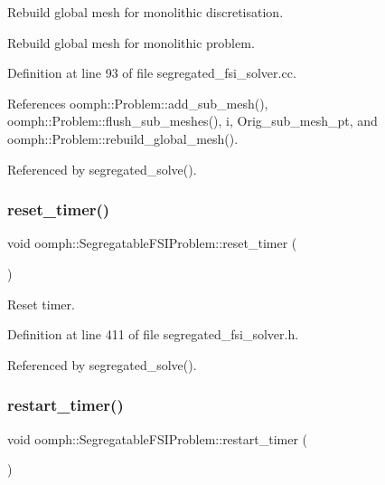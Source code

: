 Rebuild global mesh for monolithic discretisation. 

Rebuild global mesh for monolithic problem. 

Definition at line 93 of file segregated\+\_\+fsi\+\_\+solver.\+cc.



References oomph\+::\+Problem\+::add\+\_\+sub\+\_\+mesh(), oomph\+::\+Problem\+::flush\+\_\+sub\+\_\+meshes(), i, Orig\+\_\+sub\+\_\+mesh\+\_\+pt, and oomph\+::\+Problem\+::rebuild\+\_\+global\+\_\+mesh().



Referenced by segregated\+\_\+solve().

\mbox{\label{classoomph_1_1SegregatableFSIProblem_a61ae984ed6baba413b7577ce1d1b5dc3}} 
\subsubsection{\texorpdfstring{reset\+\_\+timer()}{reset\_timer()}}
{\footnotesize\ttfamily void oomph\+::\+Segregatable\+F\+S\+I\+Problem\+::reset\+\_\+timer (\begin{DoxyParamCaption}{ }\end{DoxyParamCaption})\hspace{0.3cm}{\ttfamily [inline]}}



Reset timer. 



Definition at line 411 of file segregated\+\_\+fsi\+\_\+solver.\+h.



Referenced by segregated\+\_\+solve().

\mbox{\label{classoomph_1_1SegregatableFSIProblem_a2896156c47a5a6c2e7a390057d394e10}} 
\subsubsection{\texorpdfstring{restart\+\_\+timer()}{restart\_timer()}}
{\footnotesize\ttfamily void oomph\+::\+Segregatable\+F\+S\+I\+Problem\+::restart\+\_\+timer (\begin{DoxyParamCaption}{ }\end{DoxyParamCaption})\hspace{0.3cm}{\ttfamily [inline]}}



